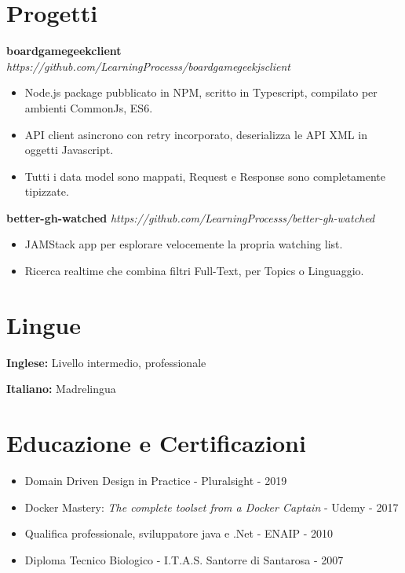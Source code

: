 \documentclass[10pt]{article}
\begin{document}
\section{Progetti}
\vspace{-0.4em}
\large\textbf{boardgamegeekclient} \hfill \textit{https://github.com/LearningProcesss/boardgamegeekjsclient}
\begin{itemize}[noitemsep,nolistsep,leftmargin=1em]
	\item Node.js package pubblicato in NPM, scritto in Typescript, compilato per ambienti CommonJs, ES6.
	\item API client asincrono con retry incorporato, deserializza le API XML in oggetti Javascript.
	\item Tutti i data model sono mappati, Request e Response sono completamente tipizzate.
\end{itemize}
\large\textbf{better-gh-watched} \hfill \textit{https://github.com/LearningProcesss/better-gh-watched}
\begin{itemize}[noitemsep,nolistsep,leftmargin=1em]
	\item JAMStack app per esplorare velocemente la propria watching list.
	\item Ricerca realtime che combina filtri Full-Text, per Topics o Linguaggio.
\end{itemize}

\vspace{-0.8em}

\section{Lingue}
\vspace{-1.6em}
\begin{multicols}{2}
	\begin{flushleft}
		\textbf{Inglese:} Livello intermedio, professionale
	\end{flushleft}
	\columnbreak
	\begin{flushright}
		\textbf{Italiano:} Madrelingua
	\end{flushright}
\end{multicols}


\section{Educazione e Certificazioni}
\begin{itemize}[noitemsep,nolistsep,leftmargin=1.5em]
	\item Domain Driven Design in Practice - Pluralsight - 2019
	\item Docker Mastery: \textit{The complete toolset from a Docker Captain} - Udemy - 2017
	\item Qualifica professionale, sviluppatore java e .Net - ENAIP - 2010
	\item Diploma Tecnico Biologico - I.T.A.S. Santorre di Santarosa - 2007
\end{itemize}
\end{document}

